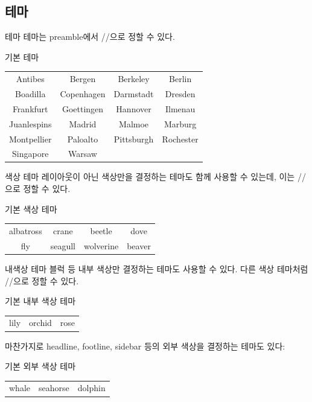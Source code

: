 \documentclass[compress]{beamer}
\begin{document}
\subsection{테마}
\begin{frame}{테마}
  테마는 preamble에서 \ltxverb/\usetheme{}/으로 정할 수 있다.
  \begin{exampleblock}{기본 테마}
    \begin{center}
      \begin{tabular}{cccc}
        Antibes & Bergen & Berkeley & Berlin \\
        Boadilla & Copenhagen & Darmstadt & Dresden \\
        Frankfurt & Goettingen & Hannover & Ilmenau \\
        Juanlespins & Madrid & Malmoe & Marburg \\
        Montpellier & Paloalto & Pittsburgh & Rochester \\
        Singapore & Warsaw &&
      \end{tabular}
    \end{center}
  \end{exampleblock}
\end{frame}

\begin{frame}{색상 테마}
  레이아웃이 아닌 색상만을 결정하는 테마도 함께 사용할 수 있는데, 이는
  \ltxverb/\usecolortheme{}/으로 정할 수 있다.
  \begin{exampleblock}{기본 색상 테마}
    \begin{center}
      \begin{tabular}{cccc}
        albatross & crane & beetle & dove \\
        fly & seagull & wolverine & beaver
      \end{tabular}
    \end{center}
  \end{exampleblock}
\end{frame}

\begin{frame}{내 색상 테마}
  블럭 등 내부 색상만 결정하는 테마도 사용할 수 있다.
  다른 색상 테마처럼 \ltxverb/\usecolortheme{}/으로 정할 수 있다.
  \begin{exampleblock}{기본 내부 색상 테마}
    \begin{tabular}{ccc}
      lily & orchid & rose
    \end{tabular}
  \end{exampleblock}

  마찬가지로 headline, footline, sidebar 등의 외부 색상을 결정하는 테마도 있다:
  \begin{exampleblock}{기본 외부 색상 테마}
    \begin{tabular}{ccc}
      whale & seahorse & dolphin
    \end{tabular}
  \end{exampleblock}
\end{frame}
\end{document}
